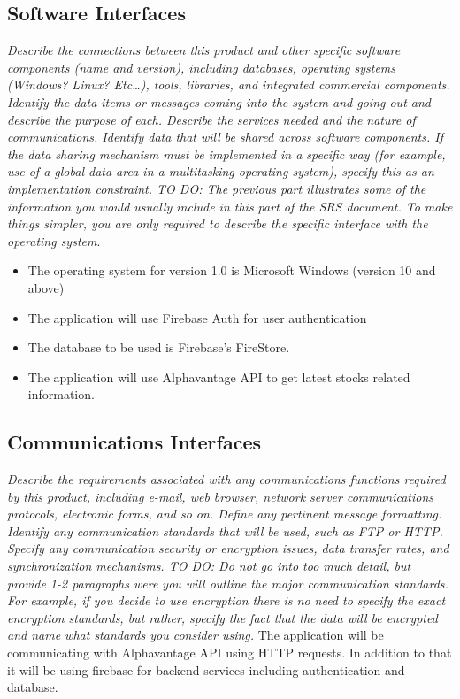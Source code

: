 \documentclass[12 pt, a4paper]{report}
\begin{document}
	\subsection {Software Interfaces}
	\textit{Describe the connections between this product and other specific software components (name and version), including databases, operating systems (Windows? Linux? Etc…), tools, libraries, and integrated commercial components. Identify the data items or messages coming into the system and going out and describe the purpose of each. Describe the services needed and the nature of communications. Identify data that will be shared across software components. If the data sharing mechanism must be implemented in a specific way (for example, use of a global data area in a multitasking operating system), specify this as an implementation constraint. 
	TO DO: The previous part illustrates some of the information you would usually include in this part of the SRS document. To make things simpler, you are only required to describe the specific interface with the operating system}.
	\begin{itemize}
		\item The operating system for version 1.0 is Microsoft Windows (version 10 and above)
		\item The application will use Firebase Auth for user authentication
		\item The database to be used is Firebase's FireStore.
		\item The application will use Alphavantage API to get latest stocks related information.
	\end{itemize}
	
	\subsection {Communications Interfaces}
	\textit{Describe the requirements associated with any communications functions required by this product, including e-mail, web browser, network server communications protocols, electronic forms, and so on. Define any pertinent message formatting. Identify any communication standards that will be used, such as FTP or HTTP. Specify any communication security or encryption issues, data transfer rates, and synchronization mechanisms.
	TO DO: Do not go into too much detail, but provide 1-2 paragraphs were you will outline the major communication standards. For example, if you decide to use encryption there is no need to specify the exact encryption standards, but rather, specify the fact that the data will be encrypted and name what standards you consider using.}
	The application will be communicating with Alphavantage API using HTTP requests. In addition to that it will be using firebase for backend services including authentication and database.
	
\end{document}
